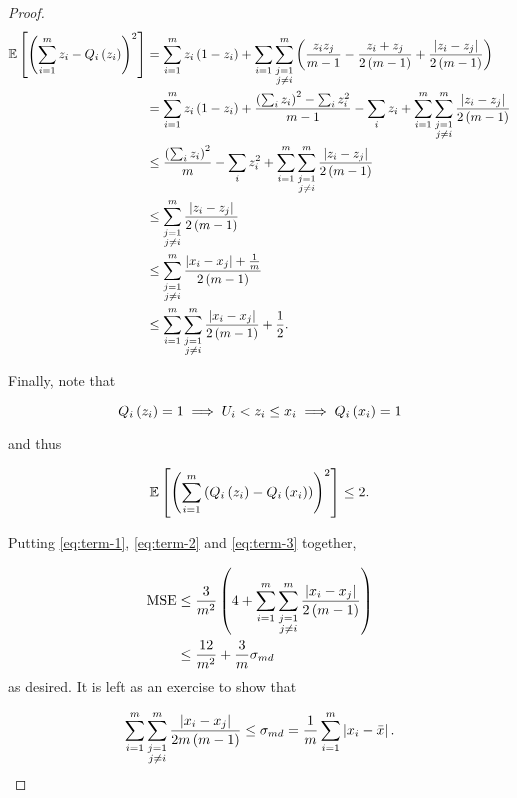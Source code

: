 \documentclass[twoside]{article}
\begin{document}
\begin{proof}
    \begin{align}
        \mathbb{E}\left[ \left(\sum_{i=1}^mz_i-Q_i\left(z_i\right)\right)^2 \right] &= \sum_{i=1}^mz_i\left(1-z_i\right) + \sum_{i=1}\sum_{\substack{j=1\\j\neq i}}^m \left(\frac{z_iz_j}{m-1} - \frac{z_i+z_j}{2\left(m-1\right)} + \frac{\left\vert z_i-z_j\right\vert}{2\left(m-1\right)}\right) \\
                                                      &= \sum_{i=1}^mz_i\left(1-z_i\right) + \frac{\left(\sum_iz_i\right)^2-\sum_iz_i^2}{m-1} - \sum_iz_i + \sum_{i=1}^m\sum_{\substack{j=1\\j\neq i}}^m\frac{\left\vert z_i-z_j\right\vert}{2\left(m-1\right)} \\
                                                      &\le \frac{\left(\sum_iz_i\right)^2}{m} - \sum_iz_i^2 + \sum_{i=1}^m\sum_{\substack{j=1\\j\neq i}}^m\frac{\left\vert z_i-z_j\right\vert}{2\left(m-1\right)} \\
                                                      &\le \sum_{\substack{j=1\\j\neq i}}^m\frac{\left\vert z_i-z_j\right\vert}{2\left(m-1\right)} \\
                                                      &\le \sum_{\substack{j=1\\j\neq i}}^m\frac{\left\vert x_i-x_j\right\vert+\frac{1}{m}}{2\left(m-1\right)} \\
                                                      &\le \sum_{i=1}^m\sum_{\substack{j=1\\j\neq i}}^m\frac{\left\vert x_i-x_j\right\vert}{2\left(m-1\right)} + \frac{1}{2}.
                                                      \label{eq:term-2}
    \end{align}

    Finally, note that

    \begin{equation}
        Q_i\left(z_i\right) = 1 \implies U_i < z_i \le x_i \implies Q_i\left(x_i\right) = 1
        \label{eq:ineq-qz-qx}
    \end{equation}

    and thus

    \begin{equation}
        \mathbb{E}\left[ \left(\sum_{i=1}^m\left(Q_i\left(z_i\right)-Q_i\left(x_i\right)\right)\right)^2 \right] \le 2.
        \label{eq:term-3}
    \end{equation}

    Putting \eqref{eq:term-1}, \eqref{eq:term-2} and \eqref{eq:term-3} together,

    \begin{align}
        \mathrm{MSE} &\le \frac{3}{m^2}\left(4 + \sum_{i=1}^m\sum_{\substack{j=1\\j\neq i}}^m\frac{\left\vert x_i-x_j\right\vert}{2\left(m-1\right)}\right) \\
                     &\le \frac{12}{m^2} + \frac{3}{m}\sigma_{md}
                     \label{eq:mse-claim-proof}
    \end{align}
    as desired. It is left as an exercise to show that

    \begin{equation}
        \sum_{i=1}^m\sum_{\substack{j=1\\j\neq i}}^m\frac{\left\vert x_i-x_j\right\vert}{2m\left(m-1\right)} \le \sigma_{md} = \frac{1}{m}\sum_{i=1}^m\left\vert x_i-\bar{x}\right\vert.
        \label{eq:md-ineq}
    \end{equation}
\end{proof}
\end{document}
